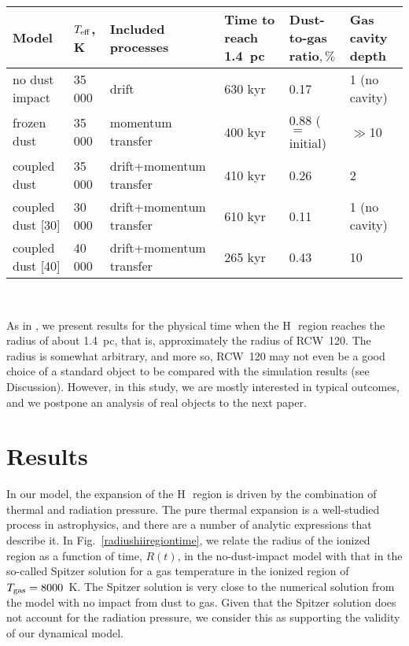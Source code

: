 \documentclass[a4paper,fleqn,usenatbib]{mnras}
\newcommand{\hii}    {H\,{\sc{ii}}~}
\begin{document}
\begin{table*}
\caption{Input and output parameters of models considered. Data shown in columns 5 and 6 correspond to the moment when the \hii region reaches 1.4~pc in size. The dust-to-gas ratio in column 5 is averaged over the volume within 1.4~pc. The inner gas cavity depth is calculated as the ratio between the \hii density at 1.4~pc and at 0.01~pc.}
\begin{tabular}{l|l|l|l|l|l}
\hline
Model  & $T_{\rm eff}$, K & Included processes & Time to reach 1.4~pc & Dust-to-gas ratio$, \%$ & Gas cavity depth\\
\hline
no dust impact               & 35\,000 & drift                   & 630 kyr &  0.17               &   1 (no cavity)     \\
frozen dust                  & 35\,000 & momentum transfer       & 400 kyr &  0.88 ($=$ initial) &   $\gg$10   \\
coupled dust                 & 35\,000 & drift+momentum transfer & 410 kyr &  0.26               &   2 \\
coupled dust [30]            & 30\,000 & drift+momentum transfer & 610 kyr &  0.11               &   1   (no cavity)   \\
coupled dust [40]            & 40\,000 & drift+momentum transfer & 265 kyr &  0.43               &   10  \\
\hline
\end{tabular}\\
\label{models}
\end{table*}

As in , we present results for the physical time when the \hii region reaches the radius of about 1.4~pc, that is, approximately the radius of RCW~120. The radius is somewhat arbitrary, and more so, RCW~120 may not even be a good choice of a standard object to be compared with the simulation results (see Discussion). However, in this study, we are mostly interested in typical outcomes, and we postpone an analysis of real objects to the next paper.

\vspace{-0.5cm}
\section{Results}

In our model, the expansion of the \hii region is driven by the combination of thermal and radiation pressure. The pure thermal expansion is a well-studied process in astrophysics, and there are a number of analytic expressions that describe it. In  Fig.~\ref{radiushiiregiontime}, we relate the radius of the ionized region as a function of time, $R(t)$, in the no-dust-impact model with that in the so-called Spitzer solution \citep{spitzerbook} for a gas temperature in the ionized region of $T_{\rm gas}=8000$~K. The Spitzer solution is very close to the numerical solution from the model with no impact from dust to gas. Given that the Spitzer solution does not account for the radiation pressure, we consider this as supporting the validity of our dynamical model.
\end{document}
